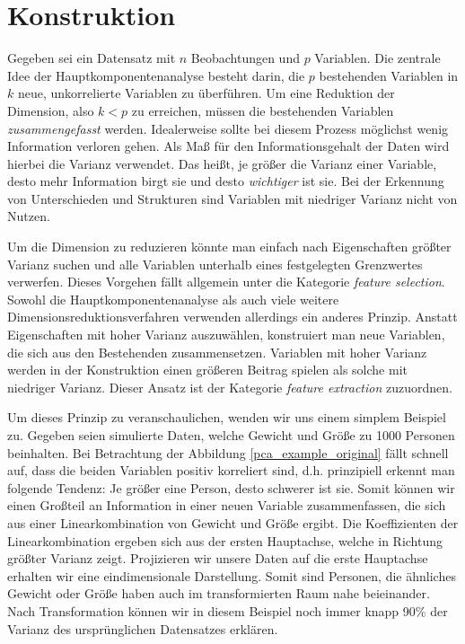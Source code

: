 

\section{Konstruktion}

Gegeben sei ein Datensatz mit $n$ Beobachtungen und $p$ Variablen. Die zentrale Idee der Hauptkomponentenanalyse besteht darin, die $p$ bestehenden Variablen in $k$ neue, unkorrelierte Variablen zu überführen. Um eine Reduktion der Dimension, also $k < p$ zu erreichen, müssen die bestehenden Variablen \textit{zusammengefasst} werden. Idealerweise sollte bei diesem Prozess möglichst wenig Information verloren gehen. Als Maß für den Informationsgehalt der Daten wird hierbei die Varianz verwendet. Das heißt, je größer die Varianz einer Variable, desto mehr Information birgt sie und desto \textit{wichtiger} ist sie. Bei der Erkennung von Unterschieden und Strukturen sind Variablen mit niedriger Varianz nicht von Nutzen. 

Um die Dimension zu reduzieren könnte man einfach nach Eigenschaften größter Varianz suchen und alle Variablen unterhalb eines festgelegten Grenzwertes verwerfen. Dieses Vorgehen fällt allgemein unter die Kategorie \textit{feature selection}. Sowohl die Hauptkomponentenanalyse als auch viele weitere Dimensionsreduktionsverfahren verwenden allerdings ein anderes Prinzip. Anstatt Eigenschaften mit hoher Varianz auszuwählen, konstruiert man neue Variablen, die sich aus den Bestehenden zusammensetzen. Variablen mit hoher Varianz werden in der Konstruktion einen größeren Beitrag spielen als solche mit niedriger Varianz. Dieser Ansatz ist der Kategorie \textit{feature extraction} zuzuordnen.

Um dieses Prinzip zu veranschaulichen, wenden wir uns einem simplem Beispiel zu. Gegeben seien simulierte Daten, welche Gewicht und Größe zu 1000 Personen beinhalten. Bei Betrachtung der Abbildung \ref{pca_example_original} fällt schnell auf, dass die beiden Variablen positiv korreliert sind, d.h. prinzipiell erkennt man folgende Tendenz: Je größer eine Person, desto schwerer ist sie. Somit können wir einen Großteil an Information in einer neuen Variable zusammenfassen, die sich aus einer Linearkombination von Gewicht und Größe ergibt. Die Koeffizienten der Linearkombination ergeben sich aus der ersten Hauptachse, welche in Richtung größter Varianz zeigt. Projizieren wir unsere Daten auf die erste Hauptachse erhalten wir eine eindimensionale Darstellung. Somit sind Personen, die ähnliches Gewicht oder Größe haben auch im transformierten Raum nahe beieinander. Nach Transformation können wir in diesem Beispiel noch immer knapp 90\% der Varianz des ursprünglichen Datensatzes erklären.\\

